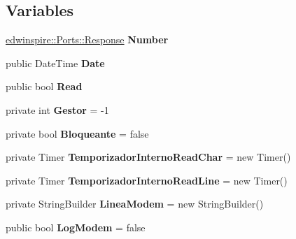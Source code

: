 \subsection*{Variables}
\begin{DoxyCompactItemize}
\item 
\hypertarget{namespaceedwinspire_1_1_ports_a809bb99c77e120d0d3e305149731746c}{\hyperlink{classedwinspire_1_1_ports_1_1_response}{edwinspire\-::\-Ports\-::\-Response} {\bfseries Number}}\label{namespaceedwinspire_1_1_ports_a809bb99c77e120d0d3e305149731746c}

\item 
\hypertarget{namespaceedwinspire_1_1_ports_a85143858f34117053e5460d22df04df8}{public Date\-Time {\bfseries Date}}\label{namespaceedwinspire_1_1_ports_a85143858f34117053e5460d22df04df8}

\item 
\hypertarget{namespaceedwinspire_1_1_ports_a5efed4bf03757ef2f2356e4d58bc0b25}{public bool {\bfseries Read}}\label{namespaceedwinspire_1_1_ports_a5efed4bf03757ef2f2356e4d58bc0b25}

\item 
\hypertarget{namespaceedwinspire_1_1_ports_a7f31b8084b1c093dde91fd7d442f0c33}{private int {\bfseries Gestor} = -\/1}\label{namespaceedwinspire_1_1_ports_a7f31b8084b1c093dde91fd7d442f0c33}

\item 
\hypertarget{namespaceedwinspire_1_1_ports_a2da87d6ac29df3f3ae83c405a4cfcd0f}{private bool {\bfseries Bloqueante} = false}\label{namespaceedwinspire_1_1_ports_a2da87d6ac29df3f3ae83c405a4cfcd0f}

\item 
\hypertarget{namespaceedwinspire_1_1_ports_a511c71a745dc25f1cec7d9b3977c1029}{private Timer {\bfseries Temporizador\-Interno\-Read\-Char} = new Timer()}\label{namespaceedwinspire_1_1_ports_a511c71a745dc25f1cec7d9b3977c1029}

\item 
\hypertarget{namespaceedwinspire_1_1_ports_a3fcb86d18a35e8e4926c82ffa679911a}{private Timer {\bfseries Temporizador\-Interno\-Read\-Line} = new Timer()}\label{namespaceedwinspire_1_1_ports_a3fcb86d18a35e8e4926c82ffa679911a}

\item 
\hypertarget{namespaceedwinspire_1_1_ports_a572884312471246cd0581385d6ce5abd}{private String\-Builder {\bfseries Linea\-Modem} = new String\-Builder()}\label{namespaceedwinspire_1_1_ports_a572884312471246cd0581385d6ce5abd}

\item 
\hypertarget{namespaceedwinspire_1_1_ports_a2d90f7f91e2a32b3ba4885640203178a}{public bool {\bfseries Log\-Modem} = false}\label{namespaceedwinspire_1_1_ports_a2d90f7f91e2a32b3ba4885640203178a}

\end{DoxyCompactItemize}


